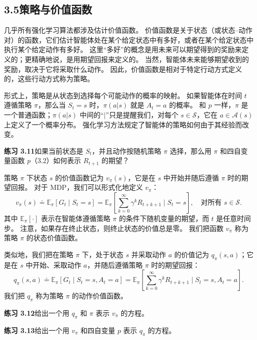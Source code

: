 \documentclass[UTF8, 12pt, fontset=fandol, oneside]{ctexart}
\begin{document}
\subsection*{3.5\quad 策略与价值函数}

几乎所有强化学习算法都涉及估计价值函数。
价值函数是关于状态（或状态--动作对）的函数，它们估计智能体处在某个给定状态中有多好，或者在某个给定状态中执行某个给定动作有多好。
这里“多好”的概念是用未来可以期望得到的奖励来定义的；更精确地说，是用期望回报来定义的。
当然，智能体未来能够期望收到的奖励，取决于它将采取什么动作。
因此，价值函数是相对于特定行动方式定义的，这些行动方式称为策略。

形式上，策略是从状态到选择每个可能动作的概率的映射。
如果智能体在时间 $t$ 遵循策略 $\pi$，那么当 $S_t=s$ 时，$\pi(a|s)$ 就是 $A_t=a$ 的概率。
和 $p$ 一样，$\pi$ 是一个普通函数；$\pi(a|s)$ 中间的“$|$”只是提醒我们，对每个 $s\in\mathcal{S}$，它在 $a\in\mathcal{A}(s)$ 上定义了一个概率分布。
强化学习方法规定了智能体的策略如何由于其经验而改变。

\noindent\textbf{练习 3.11}\quad 如果当前状态是 $S_t$，并且动作按随机策略 $\pi$ 选择，那么用 $\pi$ 和四自变量函数 $p$（3.2）如何表示 $R_{t+1}$ 的期望？

策略 $\pi$ 下状态 $s$ 的价值函数记为 $v_\pi(s)$，它是在 $s$ 中开始并随后遵循 $\pi$ 时的期望回报。
对于 MDP，我们可以形式化地定义 $v_\pi$：
\begin{equation}
v_\pi(s)\doteq \mathbb{E}_\pi[G_t\mid S_t=s]
=\mathbb{E}_\pi\!\left[\sum_{k=0}^{\infty}\gamma^kR_{t+k+1}\mid S_t=s\right],
\quad \text{对所有 }s\in\mathcal{S}.
\tag{3.12}
\end{equation}
其中 $\mathbb{E}_\pi[\cdot]$ 表示在智能体遵循策略 $\pi$ 的条件下随机变量的期望，而 $t$ 是任意时间步。
注意，如果存在终止状态，则终止状态的价值总是零。
我们把函数 $v_\pi$ 称为策略 $\pi$ 的状态价值函数。

类似地，我们把在策略 $\pi$ 下，处于状态 $s$ 并采取动作 $a$ 的价值记为 $q_\pi(s,a)$；它是在 $s$ 中开始、采取动作 $a$，并随后遵循策略 $\pi$ 时的期望回报：
\begin{equation}
q_\pi(s,a)\doteq \mathbb{E}_\pi[G_t\mid S_t=s,A_t=a]
=\mathbb{E}_\pi\!\left[\sum_{k=0}^{\infty}\gamma^kR_{t+k+1}\mid S_t=s,A_t=a\right].
\tag{3.13}
\end{equation}
我们把 $q_\pi$ 称为策略 $\pi$ 的动作价值函数。

\noindent\textbf{练习 3.12}\quad 给出一个用 $q_\pi$ 和 $\pi$ 表示 $v_\pi$ 的方程。

\noindent\textbf{练习 3.13}\quad 给出一个用 $v_\pi$ 和四自变量 $p$ 表示 $q_\pi$ 的方程。
\end{document}
